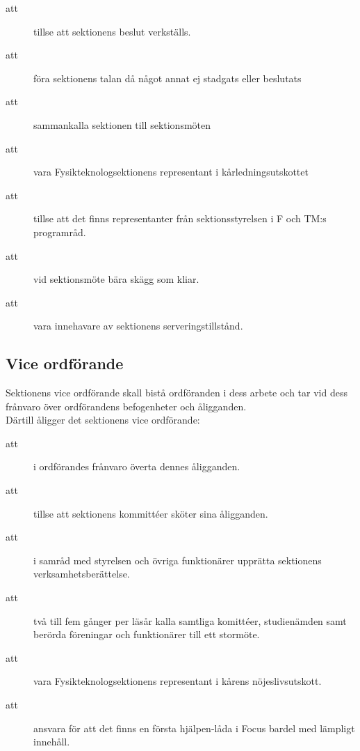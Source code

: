 \begin{description}
\item[att] tillse att sektionens beslut verkställs. 
\item[att] föra sektionens talan då något annat ej stadgats eller beslutats
\item[att] sammankalla sektionen till sektionsmöten
\item[att] vara Fysikteknologsektionens representant i kårledningsutskottet
\item[att] tillse att det finns representanter från sektionsstyrelsen i F och TM:s programråd.
\item[att] vid sektionsmöte bära skägg som kliar.
\item[att] vara innehavare av sektionens serveringstillstånd.
\end{description}

\subsection{Vice ordförande}
Sektionens vice ordförande skall bistå ordföranden i dess arbete och tar vid dess frånvaro över ordförandens befogenheter och åligganden. \\
Därtill åligger det sektionens vice ordförande:
\begin{description}
\item[att] i ordförandes frånvaro överta dennes åligganden. 
\item[att] tillse att sektionens kommittéer sköter sina åligganden. 
\item[att] i samråd med styrelsen och övriga funktionärer upprätta sektionens verksamhetsberättelse.
\item[att] två till fem gånger per läsår kalla samtliga komittéer, studienämden samt berörda föreningar och funktionärer till ett stormöte. 
\item[att] vara Fysikteknologsektionens representant i kårens nöjeslivsutskott. 
\item[att] ansvara för att det finns en första hjälpen-låda i Focus bardel med lämpligt innehåll. 
\end{description}

